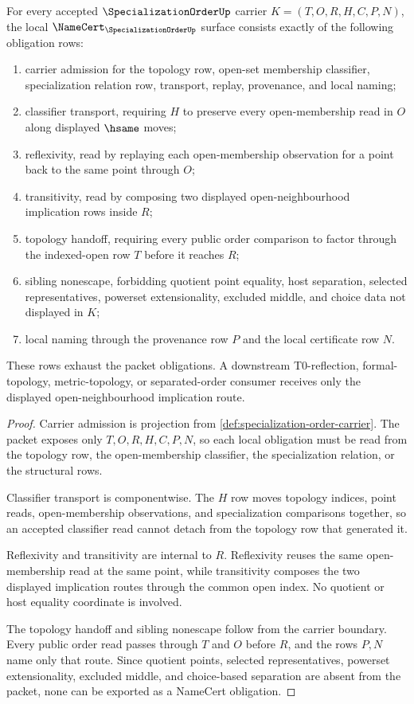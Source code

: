 \begin{theorem}
\label{thm:specialization-order-namecert-obligations}
For every accepted $\SpecializationOrderUp$ carrier $K=(T,O,R,H,C,P,N)$, the local $\NameCert_{\SpecializationOrderUp}$ surface consists exactly of the following obligation rows:
\begin{enumerate}
\item carrier admission for the topology row, open-set membership classifier, specialization relation row, transport, replay, provenance, and local naming;
\item classifier transport, requiring $H$ to preserve every open-membership read in $O$ along displayed $\hsame$ moves;
\item reflexivity, read by replaying each open-membership observation for a point back to the same point through $O$;
\item transitivity, read by composing two displayed open-neighbourhood implication rows inside $R$;
\item topology handoff, requiring every public order comparison to factor through the indexed-open row $T$ before it reaches $R$;
\item sibling nonescape, forbidding quotient point equality, host separation, selected representatives, powerset extensionality, excluded middle, and choice data not displayed in $K$;
\item local naming through the provenance row $P$ and the local certificate row $N$.
\end{enumerate}
These rows exhaust the packet obligations. A downstream T0-reflection, formal-topology, metric-topology, or separated-order consumer receives only the displayed open-neighbourhood implication route.
\end{theorem}
\begin{proof}
Carrier admission is projection from \autoref{def:specialization-order-carrier}. The packet exposes only $T,O,R,H,C,P,N$, so each local obligation must be read from the topology row, the open-membership classifier, the specialization relation, or the structural rows.

Classifier transport is componentwise. The $H$ row moves topology indices, point reads, open-membership observations, and specialization comparisons together, so an accepted classifier read cannot detach from the topology row that generated it.

Reflexivity and transitivity are internal to $R$. Reflexivity reuses the same open-membership read at the same point, while transitivity composes the two displayed implication routes through the common open index. No quotient or host equality coordinate is involved.

The topology handoff and sibling nonescape follow from the carrier boundary. Every public order read passes through $T$ and $O$ before $R$, and the rows $P,N$ name only that route. Since quotient points, selected representatives, powerset extensionality, excluded middle, and choice-based separation are absent from the packet, none can be exported as a NameCert obligation.
\end{proof}

